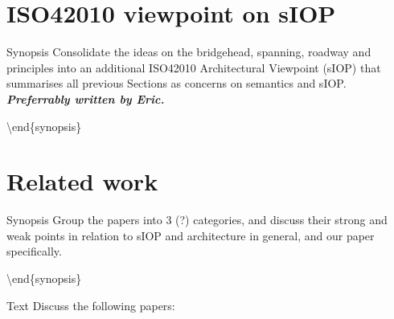 \documentclass[a4paper,11pt,oneside,oldfontcommands]{memoir}
\theoremstyle{definition}
\theoremstyle{break}		%
\numberwithin{equation}{chapter}
\numberwithin{figure}{chapter}
\begin{document}
\hypertarget{iso42010-viewpoint-on-siop}{%
\chapter{ISO42010 viewpoint on sIOP}\label{iso42010-viewpoint-on-siop}}

Synopsis Consolidate the ideas on the bridgehead, spanning, roadway and
principles into an additional ISO42010 Architectural Viewpoint (sIOP)
that summarises all previous Sections as concerns on semantics and sIOP.
\textbf{\emph{Preferrably written by Eric.}}

\textbackslash{}end\{synopsis\}

\hypertarget{related-work}{%
\chapter{Related work}\label{related-work}}

Synopsis Group the papers into 3 (?) categories, and discuss their
strong and weak points in relation to sIOP and architecture in general,
and our paper specifically.

\textbackslash{}end\{synopsis\}

Text Discuss the following papers:
\end{document}
